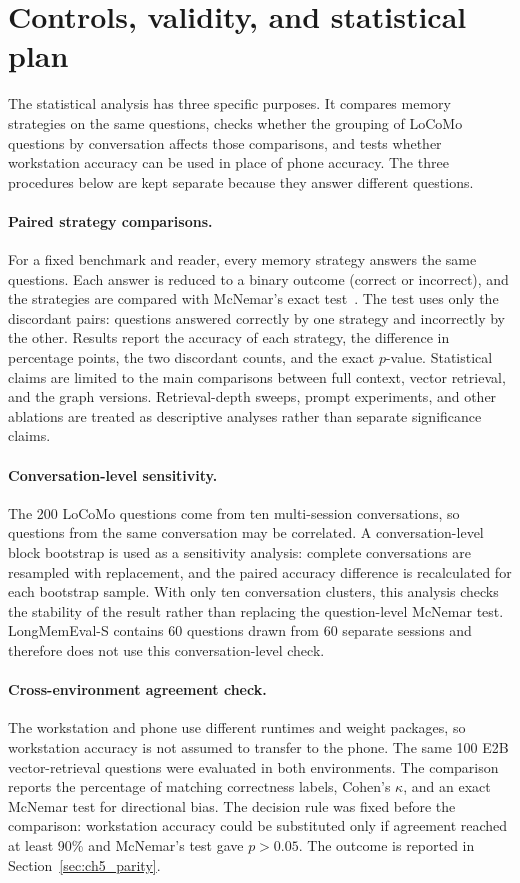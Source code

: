 \section{Controls, validity, and statistical plan}
\label{sec:validity}

The statistical analysis has three specific purposes. It compares memory strategies on the same
questions, checks whether the grouping of LoCoMo questions by conversation affects those comparisons,
and tests whether workstation accuracy can be used in place of phone accuracy. The three procedures
below are kept separate because they answer different questions.

\paragraph{Paired strategy comparisons.} For a fixed benchmark and reader, every memory strategy
answers the same questions. Each answer is reduced to a binary outcome (correct or incorrect), and
the strategies are compared with McNemar's exact test~\citep{mcnemar}. The test uses only the
discordant pairs: questions answered correctly by one strategy and incorrectly by the other. Results
report the accuracy of each strategy, the difference in percentage points, the two discordant counts,
and the exact $p$-value. Statistical claims are limited to the main comparisons between full context,
vector retrieval, and the graph versions. Retrieval-depth sweeps, prompt experiments, and other
ablations are treated as descriptive analyses rather than separate significance claims.

\paragraph{Conversation-level sensitivity.} The 200 LoCoMo questions come from ten multi-session
conversations, so questions from the same conversation may be correlated. A conversation-level block
bootstrap is used as a sensitivity analysis: complete conversations are resampled with replacement,
and the paired accuracy difference is recalculated for each bootstrap sample. With only ten
conversation clusters, this analysis checks the stability of the result rather than replacing the
question-level McNemar test. LongMemEval-S contains 60 questions drawn from 60 separate sessions and
therefore does not use this conversation-level check.

\paragraph{Cross-environment agreement check.} The workstation and phone use different runtimes and
weight packages, so workstation accuracy is not assumed to transfer to the phone. The same 100 E2B
vector-retrieval questions were evaluated in both environments. The comparison reports the percentage
of matching correctness labels, Cohen's $\kappa$, and an exact McNemar test for directional bias. The
decision rule was fixed before the comparison: workstation accuracy could be substituted only if
agreement reached at least 90\% and McNemar's test gave $p>0.05$. The outcome is reported in
Section~\ref{sec:ch5_parity}.

